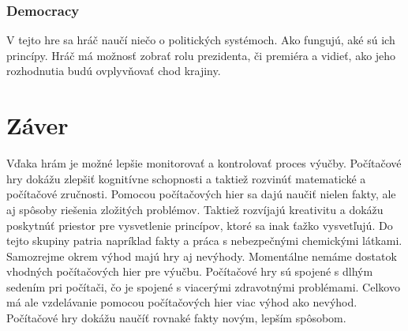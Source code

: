 \documentclass[10pt,twoside,slovak,a4paper]{article}
\begin{document}
\subsubsection{Democracy} 
V tejto hre sa hráč naučí niečo o politických systémoch. Ako fungujú, aké sú ich princípy. 
Hráč má možnosť zobrať rolu prezidenta, či premiéra a vidieť, ako jeho rozhodnutia budú ovplyvňovať chod krajiny.





\section{Záver} \label{zaver} %
Vďaka hrám je možné lepšie monitorovať a kontrolovať proces výučby. Počítačové hry dokážu zlepšiť kognitívne schopnosti a taktiež rozvinúť matematické a počítačové zručnosti. Pomocou počítačových hier sa dajú naučiť nielen fakty, ale aj spôsoby riešenia zložitých problémov. Taktiež rozvíjajú kreativitu a dokážu poskytnúť priestor pre vysvetlenie princípov, ktoré sa inak ťažko vysvetľujú. Do tejto skupiny patria napríklad fakty a práca s nebezpečnými chemickými látkami. Samozrejme okrem výhod majú hry aj nevýhody. Momentálne nemáme dostatok vhodných počítačových hier pre výučbu. Počítačové hry sú spojené s dlhým sedením pri počítači, čo je spojené s viacerými zdravotnými problémami. 
Celkovo má ale vzdelávanie pomocou počítačových hier viac výhod ako nevýhod. Počítačové hry dokážu naučíť rovnaké fakty novým, lepším spôsobom.






\end{document}
